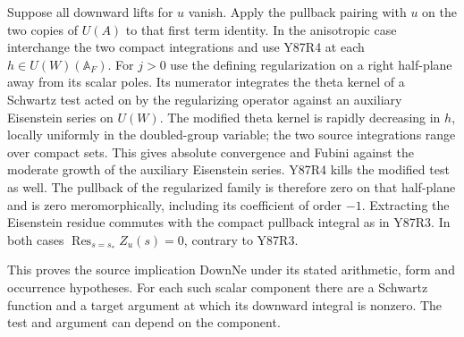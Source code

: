 Suppose all downward lifts for $u$ vanish. Apply the pullback
pairing with $u$ on the two copies of $U(A)$ to that first term
identity. In the anisotropic case interchange the two compact
integrations and use Y87R4 at each $h\in U(W)(\mathbb A_F)$.
For $j>0$ use the defining regularization on a right half-plane
away from its scalar poles. Its numerator integrates the theta
kernel of a Schwartz test acted on by the regularizing operator
against an auxiliary Eisenstein series on $U(W)$. The modified
theta kernel is rapidly decreasing in $h$, locally uniformly in
the doubled-group variable; the two source integrations range
over compact sets. This gives absolute convergence and Fubini
against the moderate growth of the auxiliary Eisenstein series.
Y87R4 kills the modified test as well. The pullback of the
regularized family is therefore zero on that half-plane and is
zero meromorphically, including its coefficient of order $-1$.
Extracting the Eisenstein residue commutes with the compact
pullback integral as in Y87R3. In both cases
$\operatorname{Res}_{s=s_*}Z_u(s)=0$, contrary to Y87R3.

This proves the source implication $\mathrm{DownNe}$ under its
stated arithmetic, form and occurrence hypotheses. For each
such scalar component there are a Schwartz function and a target
argument at which its downward integral is nonzero. The test and
argument can depend on the component.
